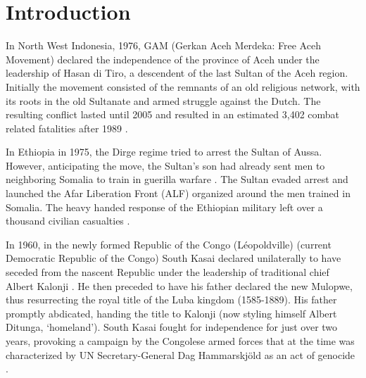 \chapter{Introduction}



In North West Indonesia, 1976, GAM (Gerkan Aceh Merdeka: Free Aceh Movement)
declared the independence of the province of Aceh under the leadership of Hasan
di Tiro, a descendent of the last Sultan of the Aceh region. Initially the
movement consisted of the remnants of an old religious network, with its roots
in the old Sultanate and armed struggle against the Dutch. The resulting
conflict lasted until 2005 and resulted in an estimated 3,402 combat related
fatalities after 1989 \citep{Aspinall2009, Pettersson2018, Sundberg2013}.

In Ethiopia in 1975, the Dirge regime tried to arrest the Sultan of Aussa. However,
anticipating the move, the Sultan's son had already sent men to neighboring
Somalia to train in guerilla warfare \citep{Shehim1985}. The Sultan evaded
arrest and launched the Afar Liberation Front (ALF) organized around the men
trained in Somalia. The heavy handed response of the Ethiopian military left
over a thousand civilian casualties \citep{UCDPconflict363}.

In 1960, in the newly formed Republic of the Congo (Léopoldville) (current
Democratic Republic of the Congo) South Kasai declared unilaterally to have
seceded from the nascent Republic under the leadership of traditional chief
Albert Kalonji \citep{Nzongola2002}. He then preceded to have his father
declared the new Mulopwe, thus resurrecting the royal title of the Luba kingdom
(1585-1889). His father promptly abdicated, handing the title to Kalonji (now
styling himself Albert Ditunga, `homeland'). South Kasai fought for independence
for just over two years, provoking a campaign by the Congolese armed forces that
at the time was characterized by UN Secretary-General Dag Hammarskjöld as an act
of genocide \citep{Nzongola2002}.

